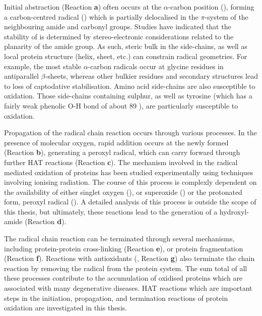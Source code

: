 Initial abstraction (Reaction \textbf{a}) often occurs at the $\alpha$-carbon position (), forming a carbon-centred radical () which is partially delocalised in the $\pi$-system of the neighbouring amide and carbonyl groups. Studies have indicated that the stability of  is determined by stereo-electronic considerations related to the planarity of the amide group.\cite{Salamone2014b} As such, steric bulk in the side-chains, as well as local protein structure (helix, sheet, etc.) can constrain radical geometries. For example, the most stable $\alpha$-carbon radicals occur at glycine residues in antiparallel $\beta$-sheets, whereas other bulkier residues and secondary structures lead to loss of captodative stabilisation.\cite{Rauk2000} Amino acid side-chains are also susceptible to oxidation. Those side-chains containing sulphur,\cite{Stadtman2004} as well as tyrosine (which has a fairly weak phenolic O-H bond of about 89 \kcalmol),\cite{Mulder2005} are particularly susceptible to oxidation.

Propagation of the radical chain reaction occurs through various processes. In the presence of molecular oxygen, rapid addition occurs at the newly formed  (Reaction \textbf{b}), generating a peroxyl radical, which can carry forward through further HAT reactions (Reaction \textbf{c}).\cite{Stadtman2003} The mechanism involved in the radical mediated oxidation of proteins has been studied experimentally using techniques involving ionising radiation.\cite{Garrison1962,Garrison1987} The course of this process is complexly dependent on the availability of either singlet oxygen (), or superoxide () or the protonated form, peroxyl radical (). A detailed analysis of this process is outside the scope of this thesis, but ultimately, these reactions lead to the generation of a hydroxyl-amide (Reaction \textbf{d}).

The radical chain reaction can be terminated through several mechanisms, including protein-protein cross-linking (Reaction \textbf{e}), or protein fragmentation (Reaction \textbf{f}). Reactions with antioxidants (, Reaction \textbf{g}) also terminate the chain reaction by removing the radical from the protein system. The sum total of all these processes contribute to the accumulation of oxidised proteins which are associated with many degenerative diseases.\cite{Halliwell2006} HAT reactions which are important steps in the initiation, propagation, and termination reactions of protein oxidation are investigated in this thesis.

